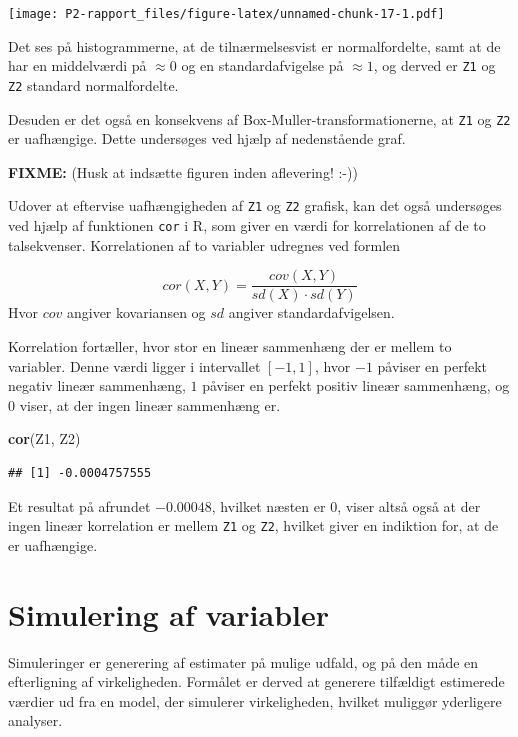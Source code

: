 \documentclass[
]{book}
\newenvironment{Shaded}{\begin{snugshade}}{\end{snugshade}}
\newcommand{\KeywordTok}[1]{\textcolor[rgb]{0.13,0.29,0.53}{\textbf{#1}}}
\newcommand{\NormalTok}[1]{#1}
\theoremstyle{definition}
\theoremstyle{definition}
\theoremstyle{definition}
\theoremstyle{remark}
\begin{document}
\texttt{[image: P2-rapport\_files/figure-latex/unnamed-chunk-17-1.pdf]}

Det ses på histogrammerne, at de tilnærmelsesvist er normalfordelte, samt at de har en middelværdi på \(\approx 0\) og en standardafvigelse på \(\approx 1\), og derved er \texttt{Z1} og \texttt{Z2} standard normalfordelte.

Desuden er det også en konsekvens af Box-Muller-transformationerne, at \texttt{Z1} og \texttt{Z2} er uafhængige. Dette undersøges ved hjælp af nedenstående graf.

\textbf{FIXME:} (Husk at indsætte figuren inden aflevering! :-))

Udover at eftervise uafhængigheden af \texttt{Z1} og \texttt{Z2} grafisk, kan det også undersøges ved hjælp af funktionen \texttt{cor} i R, som giver en værdi for korrelationen af de to talsekvenser.
Korrelationen af to variabler udregnes ved formlen

\[
cor(X, Y) = \frac{cov(X, Y)}{sd(X) \cdot sd(Y)}
\]
Hvor \(cov\) angiver kovariansen og \(sd\) angiver standardafvigelsen.

Korrelation fortæller, hvor stor en lineær sammenhæng der er mellem to variabler. Denne værdi ligger i intervallet \([-1, 1]\), hvor \(-1\) påviser en perfekt negativ lineær sammenhæng, \(1\) påviser en perfekt positiv lineær sammenhæng, og \(0\) viser, at der ingen lineær sammenhæng er.

\begin{Shaded}
\begin{Highlighting}[]
\KeywordTok{cor}\NormalTok{(Z1, Z2)}
\end{Highlighting}
\end{Shaded}

\begin{verbatim}
## [1] -0.0004757555
\end{verbatim}

Et resultat på afrundet \(-0.00048\), hvilket næsten er 0, viser altså også at der ingen lineær korrelation er mellem \texttt{Z1} og \texttt{Z2}, hvilket giver en indiktion for, at de er uafhængige.

\hypertarget{simulering-af-variabler}{%
\section{Simulering af variabler}\label{simulering-af-variabler}}

Simuleringer er generering af estimater på mulige udfald, og på den måde en efterligning af virkeligheden. Formålet er derved at generere tilfældigt estimerede værdier ud fra en model, der simulerer virkeligheden, hvilket muliggør yderligere analyser.
\end{document}
